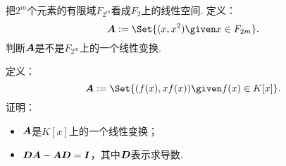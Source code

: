 \begin{example}
把\(2^m\)个元素的有限域\(F_{2^m}\)看成\(F_2\)上的线性空间.
定义：\begin{equation*}
	\vb{A} \defeq \Set{
		(x,x^2)
		\given
		x \in F_{2m}
	}.
\end{equation*}
判断\(\boldsymbol{A}\)是不是\(F_{2^m}\)上的一个线性变换.
\end{example}

\begin{example}
定义：\begin{equation*}
	\vb{A} \defeq \Set{
		(f(x),x f(x))
		\given
		f(x) \in K[x]
	}.
\end{equation*}
证明：\begin{itemize}
	\item \(\boldsymbol{A}\)是\(K[x]\)上的一个线性变换；
	\item \(\boldsymbol{D}\boldsymbol{A}-\boldsymbol{A}\boldsymbol{D}=\boldsymbol{I}\)，其中\(\boldsymbol{D}\)表示求导数.
\end{itemize}
\end{example}

